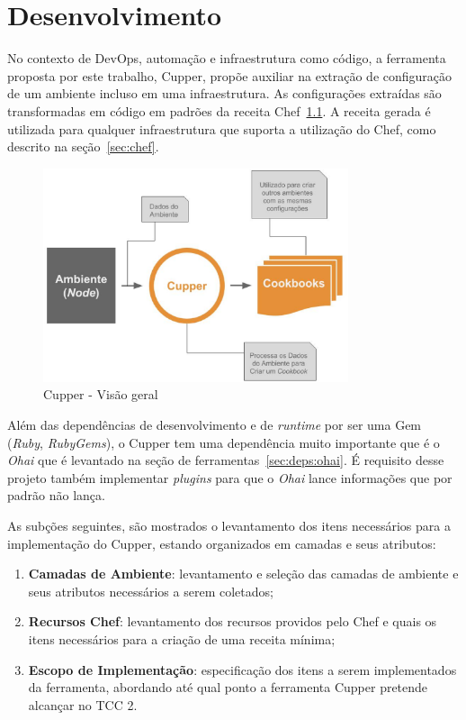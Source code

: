 \newpage\null\thispagestyle{empty}\newpage
\chapter{Desenvolvimento}
\label{chap:desenv}

No contexto de DevOps, automação e infraestrutura como código, a ferramenta
proposta por este trabalho, Cupper, propõe auxiliar na extração de configuração
de um ambiente incluso em uma infraestrutura. As configurações extraídas são
transformadas em código em padrões da receita Chef~\ref{fig:cupper_geral}. A
receita gerada é utilizada para qualquer infraestrutura que suporta a
utilização do Chef, como descrito na seção~\ref{sec:chef}.

\begin{figure}[h]
  \centering
  \includegraphics[width=0.8\textwidth]{figuras/cupper_geral.eps}
  \caption{Cupper - Visão geral}
  \label{fig:cupper_geral}
\end{figure}

Além das dependências de desenvolvimento e de \textit{runtime} por ser uma Gem
(\textit{Ruby}, \textit{RubyGems}), o Cupper tem uma dependência muito
importante que é o \textit{Ohai} que é levantado na seção de 
ferramentas~\ref{sec:deps:ohai}. É requisito desse projeto também implementar
\textit{plugins} para que o \textit{Ohai} lance informações que por padrão 
não lança.

As subções seguintes, são mostrados o levantamento dos itens necessários para
a implementação do Cupper, estando organizados em camadas e seus atributos:

\begin{enumerate}
  \item \textbf{Camadas de Ambiente}: levantamento e seleção das camadas de ambiente
    e seus atributos necessários a serem coletados;
  \item \textbf{Recursos Chef}: levantamento dos recursos providos pelo Chef e quais os
    itens necessários para a criação de uma receita mínima;
  \item \textbf{Escopo de Implementação}: especificação dos itens a serem implementados
    da ferramenta, abordando até qual ponto a ferramenta Cupper pretende alcançar
    no TCC 2.
\end{enumerate}




